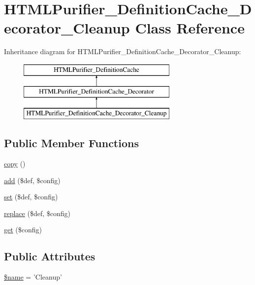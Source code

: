 \hypertarget{classHTMLPurifier__DefinitionCache__Decorator__Cleanup}{\section{H\+T\+M\+L\+Purifier\+\_\+\+Definition\+Cache\+\_\+\+Decorator\+\_\+\+Cleanup Class Reference}
\label{classHTMLPurifier__DefinitionCache__Decorator__Cleanup}
}
Inheritance diagram for H\+T\+M\+L\+Purifier\+\_\+\+Definition\+Cache\+\_\+\+Decorator\+\_\+\+Cleanup\+:\begin{figure}[H]
\begin{center}
\leavevmode
\includegraphics[height=3.000000cm]{classHTMLPurifier__DefinitionCache__Decorator__Cleanup}
\end{center}
\end{figure}
\subsection*{Public Member Functions}
\begin{DoxyCompactItemize}
\item 
\hyperlink{classHTMLPurifier__DefinitionCache__Decorator__Cleanup_ac22c785877455f3ecd59f078a67be179}{copy} ()
\item 
\hyperlink{classHTMLPurifier__DefinitionCache__Decorator__Cleanup_a53b1401ed921675cbd61995a6cc698f8}{add} (\$def, \$config)
\item 
\hyperlink{classHTMLPurifier__DefinitionCache__Decorator__Cleanup_a1d4dfb7c8d50ff8ec8209857bcd7d81e}{set} (\$def, \$config)
\item 
\hyperlink{classHTMLPurifier__DefinitionCache__Decorator__Cleanup_a1f96462860cff35dc49961dd53f91404}{replace} (\$def, \$config)
\item 
\hyperlink{classHTMLPurifier__DefinitionCache__Decorator__Cleanup_a013025a41858aaa9a1d777ae96abf85b}{get} (\$config)
\end{DoxyCompactItemize}
\subsection*{Public Attributes}
\begin{DoxyCompactItemize}
\item 
\hyperlink{classHTMLPurifier__DefinitionCache__Decorator__Cleanup_ae7665675a06d7658c6c0941c1575cb61}{\$name} = 'Cleanup'
\end{DoxyCompactItemize}


